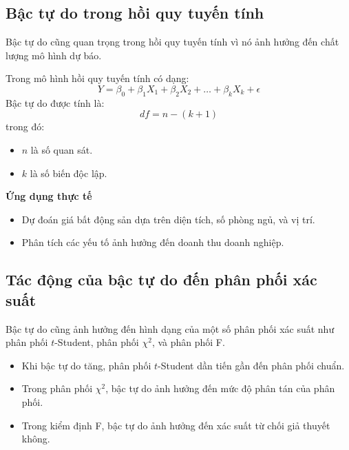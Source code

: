 \subsection{Bậc tự do trong hồi quy tuyến tính}

Bậc tự do cũng quan trọng trong hồi quy tuyến tính vì nó ảnh hưởng đến chất lượng mô hình dự báo.

Trong mô hình hồi quy tuyến tính có dạng:
\begin{equation}
Y = \beta_0 + \beta_1 X_1 + \beta_2 X_2 + \dots + \beta_k X_k + \epsilon
\end{equation}
Bậc tự do được tính là:
\begin{equation}
df = n - (k + 1)
\end{equation}
trong đó:
\begin{itemize}
    \item $n$ là số quan sát.
    \item $k$ là số biến độc lập.
\end{itemize}

\textbf{Ứng dụng thực tế}
\begin{itemize}
    \item Dự đoán giá bất động sản dựa trên diện tích, số phòng ngủ, và vị trí.
    \item Phân tích các yếu tố ảnh hưởng đến doanh thu doanh nghiệp.
\end{itemize}



\subsection{Tác động của bậc tự do đến phân phối xác suất}

Bậc tự do cũng ảnh hưởng đến hình dạng của một số phân phối xác suất như phân phối $t$-Student, phân phối $\chi^2$, và phân phối F.

\begin{itemize}

    \item Khi bậc tự do tăng, phân phối $t$-Student dần tiến gần đến phân phối chuẩn.

    \item Trong phân phối $\chi^2$, bậc tự do ảnh hưởng đến mức độ phân tán của phân phối.

    \item Trong kiểm định F, bậc tự do ảnh hưởng đến xác suất từ chối giả thuyết không.

\end{itemize}


